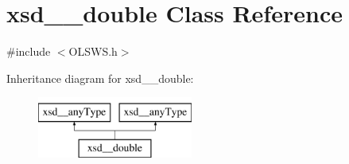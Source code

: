 \hypertarget{classxsd____double}{
\section{xsd\_\-\_\-double Class Reference}
\label{classxsd____double}
}


{\ttfamily \#include $<$OLSWS.h$>$}

Inheritance diagram for xsd\_\-\_\-double:\begin{figure}[H]
\begin{center}
\leavevmode
\includegraphics[height=2.000000cm]{classxsd____double}
\end{center}
\end{figure}
